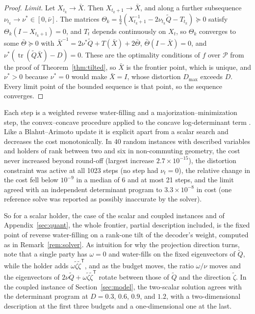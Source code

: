 \documentclass[11pt,onecolumn]{IEEEtran}
\newcommand{\tr}{\operatorname{tr}}
\begin{document}
\begin{proof}
\emph{Limit.} Let $X_{t_k}\to\bar X$. Then $X_{t_k+1}\to\bar X$, and along
a further subsequence $\nu_{t_k}\to\nu^\ast\in[0,\bar\nu]$. The matrices
$\Theta_k=\tfrac12(X_{t_k+1}^{-1}-2\nu_{t_k}\tilde Q-T_{t_k})\succeq0$ satisfy
$\Theta_k(I-X_{t_k+1})=0$, and $T_t$ depends continuously on $X_t$, so
$\Theta_k$ converges to some $\bar\Theta\succeq0$ with
$\bar X^{-1}=2\nu^\ast\tilde Q+T(\bar X)+2\bar\Theta$, $\bar\Theta(I-\bar X)=0$,
and $\nu^\ast(\tr(\tilde Q\bar X)-D)=0$. These are the optimality
conditions of $f$ over $\mathcal P$ from the proof of
Theorem~\ref{thm:tilted}, so $\bar X$ is the frontier point, which is
unique, and $\nu^\ast>0$ because $\nu^\ast=0$ would make $\bar X=I$, whose
distortion $D_{\max}$ exceeds $D$. Every limit point of the bounded
sequence is that point, so the sequence converges.
\end{proof}

Each step is a weighted reverse water-filling and a
majorization--minimization step, the convex--concave procedure applied
to the concave log-determinant term
\cite{yuille2003,lipp2016,hunter2004,sun2017}. Like a Blahut--Arimoto
update it is explicit apart from a scalar search and decreases the cost
monotonically. In 40 random instances with described variables and
holders of rank between two and six in non-commuting geometry, the cost
never increased beyond round-off (largest increase
$2.7\times10^{-15}$), the distortion constraint was active at all 1023
steps (no step had $\nu_t=0$), the relative change in the cost fell
below $10^{-9}$ in a median of 6 and at most 21 steps, and the limit
agreed with an independent determinant program to $3.3\times10^{-8}$ in
cost (one reference solve was reported as possibly inaccurate by the
solver).

So for a scalar holder, the case of the scalar and coupled instances
and of Appendix~\ref{sec:quant}, the whole frontier, partial description
included, is the fixed point of reverse water-filling on a rank-one tilt
of the decoder's weight, computed as in Remark~\ref{rem:solver}. As
intuition for why the projection direction turns, note that a single party has
$\omega=0$ and water-fills on the fixed eigenvectors of $\tilde Q$, while
the holder adds $\omega\tilde\zeta\tilde\zeta^{\mathsf T}$, and as the
budget moves, the ratio $\omega/\nu$ moves and the eigenvectors of
$2\nu\tilde Q+\omega\tilde\zeta\tilde\zeta^{\mathsf T}$ rotate between those
of $\tilde Q$ and the direction $\tilde\zeta$. In the coupled instance of
Section~\ref{sec:model}, the two-scalar solution agrees with the
determinant program at $D=0.3$, $0.6$, $0.9$, and $1.2$, with a
two-dimensional description at the first three budgets and a
one-dimensional one at the last.
\end{document}
